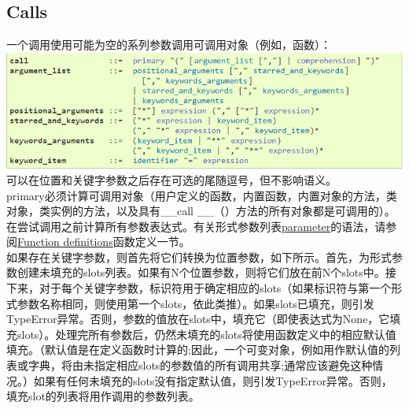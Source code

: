 \documentclass[10pt,UTF8]{ctexart}
\begin{document}
\subsection{Calls}
一个调用使用可能为空的系列参数调用可调用对象（例如，函数）：\\
\includegraphics[scale=1]{call.jpg} 
可以在位置和关键字参数之后存在可选的尾随逗号，但不影响语义。\\
\indent primary必须计算可调用对象（用户定义的函数，内置函数，内置对象的方法，类对象，类实例的方法，以及具有__call __（）方法的所有对象都是可调用的）。在尝试调用之前计算所有参数表达式。有关形式参数列表\href{https://docs.python.org/3/glossary.html#term-parameter}{parameter}的语法，请参阅\href{https://docs.python.org/3/reference/compound_stmts.html#function}{Function definitions}函数定义一节。\\
\indent 如果存在关键字参数，则首先将它们转换为位置参数，如下所示。首先，为形式参数创建未填充的slots列表。如果有N个位置参数，则将它们放在前N个slots中。接下来，对于每个关键字参数，标识符用于确定相应的slots（如果标识符与第一个形式参数名称相同，则使用第一个slots，依此类推）。如果slots已填充，则引发TypeError异常。否则，参数的值放在slots中，填充它（即使表达式为None，它填充slots）。处理完所有参数后，仍然未填充的slots将使用函数定义中的相应默认值填充。（默认值是在定义函数时计算的;因此，一个可变对象，例如用作默认值的列表或字典，将由未指定相应slots的参数值的所有调用共享;通常应该避免这种情况。）如果有任何未填充的slots没有指定默认值，则引发TypeError异常。否则，填充slot的列表将用作调用的参数列表。\\
\end{document}
